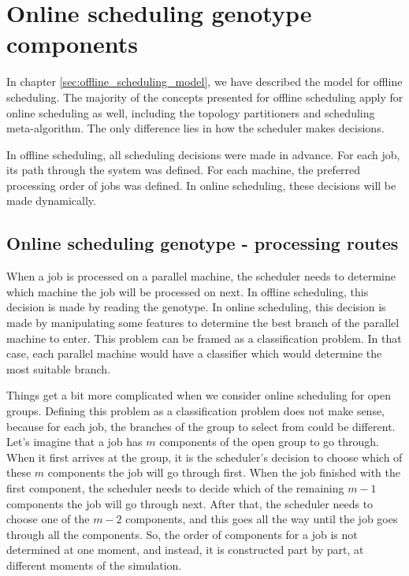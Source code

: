 \section{Online scheduling genotype components}
\label{sec:online_scheduling_genotype_components}

In chapter \ref{sec:offline_scheduling_model}, we have described the model for offline scheduling. The majority of the concepts presented for offline scheduling apply for online scheduling as well, including the topology partitioners and scheduling meta-algorithm. The only difference lies in how the scheduler makes decisions.

In offline scheduling, all scheduling decisions were made in advance. For each job, its path through the system was defined. For each machine, the preferred processing order of jobs was defined. In online scheduling, these decisions will be made dynamically.

\subsection{Online scheduling genotype - processing routes}

When a job is processed on a parallel machine, the scheduler needs to determine which machine the job will be processed on next. In offline scheduling, this decision is made by reading the genotype. In online scheduling, this decision is made by manipulating some features to determine the best branch of the parallel machine to enter. This problem can be framed as a classification problem. In that case, each parallel machine would have a classifier which would determine the most suitable branch.

Things get a bit more complicated when we consider online scheduling for open groups. Defining this problem as a classification problem does not make sense, because for each job, the branches of the group to select from could be different. Let's imagine that a job has $m$ components of the open group to go through. When it first arrives at the group, it is the scheduler's decision to choose which of these $m$ components the job will go through first. When the job finished with the first component, the scheduler needs to decide which of the remaining $m-1$ components the job will go through next. After that, the scheduler needs to choose one of the $m-2$ components, and this goes all the way until the job goes through all the components. So, the order of components for a job is not determined at one moment, and instead, it is constructed part by part, at different moments of the simulation.

